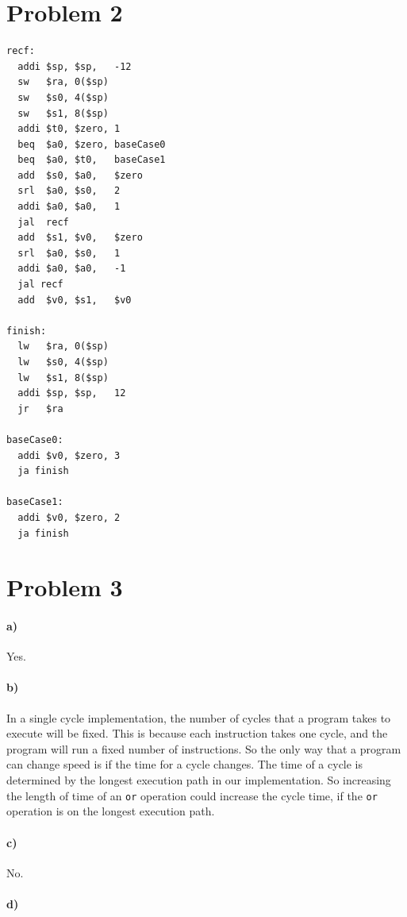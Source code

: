 \documentclass[12pt]{article}
\begin{document}
\section*{Problem 2}

\begin{verbatim}
recf:
  addi $sp, $sp,   -12
  sw   $ra, 0($sp)
  sw   $s0, 4($sp)
  sw   $s1, 8($sp)
  addi $t0, $zero, 1
  beq  $a0, $zero, baseCase0
  beq  $a0, $t0,   baseCase1
  add  $s0, $a0,   $zero
  srl  $a0, $s0,   2
  addi $a0, $a0,   1
  jal  recf
  add  $s1, $v0,   $zero
  srl  $a0, $s0,   1
  addi $a0, $a0,   -1
  jal recf
  add  $v0, $s1,   $v0

finish:
  lw   $ra, 0($sp)
  lw   $s0, 4($sp)
  lw   $s1, 8($sp)
  addi $sp, $sp,   12
  jr   $ra

baseCase0:
  addi $v0, $zero, 3
  ja finish

baseCase1:
  addi $v0, $zero, 2
  ja finish
\end{verbatim}

\section*{Problem 3}

\paragraph{a)}

Yes.

\paragraph{b)}

In a single cycle implementation, the number of cycles that a program takes to execute will be fixed. This is because each instruction takes one cycle,
and the program will run a fixed number of instructions. So the only way that a program can change speed is if the time for a cycle changes. The time
of a cycle is determined by the longest execution path in our implementation. So increasing the length of time of an \texttt{or} operation could increase
the cycle time, if the \texttt{or} operation is on the longest execution path.

\paragraph{c)}

No.

\paragraph{d)}
\end{document}
